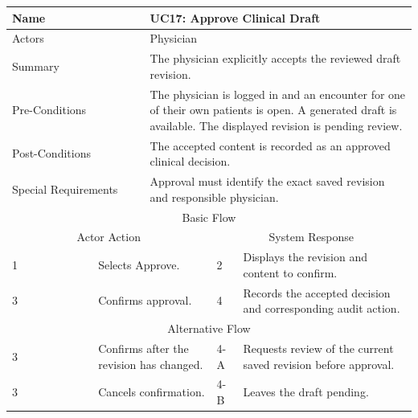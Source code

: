 \begin{reporttable}
\centering
\small
\caption{UC17: Approve Clinical Draft.}
\label{tab:kashaf:uc17}
\begin{tabular}{|p{}|p{}|p{}|p{}|p{}|}
\hline
\multicolumn{2}{|p{\dimexpr0.225\textwidth+2\tabcolsep+\arrayrulewidth\relax}|}{Name} & \multicolumn{3}{p{\dimexpr0.575\textwidth+4\tabcolsep+2\arrayrulewidth\relax}|}{UC17: Approve Clinical Draft} \\ \hline
\multicolumn{2}{|p{\dimexpr0.225\textwidth+2\tabcolsep+\arrayrulewidth\relax}|}{Actors} & \multicolumn{3}{p{\dimexpr0.575\textwidth+4\tabcolsep+2\arrayrulewidth\relax}|}{Physician} \\ \hline
\multicolumn{2}{|p{\dimexpr0.225\textwidth+2\tabcolsep+\arrayrulewidth\relax}|}{Summary} & \multicolumn{3}{p{\dimexpr0.575\textwidth+4\tabcolsep+2\arrayrulewidth\relax}|}{The physician explicitly accepts the reviewed draft revision.} \\ \hline
\multicolumn{2}{|p{\dimexpr0.225\textwidth+2\tabcolsep+\arrayrulewidth\relax}|}{Pre-Conditions} & \multicolumn{3}{p{\dimexpr0.575\textwidth+4\tabcolsep+2\arrayrulewidth\relax}|}{The physician is logged in and an encounter for one of their own patients is open. A generated draft is available. The displayed revision is pending review.} \\ \hline
\multicolumn{2}{|p{\dimexpr0.225\textwidth+2\tabcolsep+\arrayrulewidth\relax}|}{Post-Conditions} & \multicolumn{3}{p{\dimexpr0.575\textwidth+4\tabcolsep+2\arrayrulewidth\relax}|}{The accepted content is recorded as an approved clinical decision.} \\ \hline
\multicolumn{2}{|p{\dimexpr0.225\textwidth+2\tabcolsep+\arrayrulewidth\relax}|}{Special Requirements} & \multicolumn{3}{p{\dimexpr0.575\textwidth+4\tabcolsep+2\arrayrulewidth\relax}|}{Approval must identify the exact saved revision and responsible physician.} \\ \hline
\multicolumn{5}{|c|}{Basic Flow} \\ \hline
\multicolumn{3}{|c|}{Actor Action} & \multicolumn{2}{c|}{System Response} \\ \hline
1 & \multicolumn{2}{p{\dimexpr0.37\textwidth+2\tabcolsep+\arrayrulewidth\relax}|}{Selects Approve.} & 2 & Displays the revision and content to confirm. \\ \hline
3 & \multicolumn{2}{p{\dimexpr0.37\textwidth+2\tabcolsep+\arrayrulewidth\relax}|}{Confirms approval.} & 4 & Records the accepted decision and corresponding audit action. \\ \hline
\multicolumn{5}{|c|}{Alternative Flow} \\ \hline
3 & \multicolumn{2}{p{\dimexpr0.37\textwidth+2\tabcolsep+\arrayrulewidth\relax}|}{Confirms after the revision has changed.} & 4-A & Requests review of the current saved revision before approval. \\ \hline
3 & \multicolumn{2}{p{\dimexpr0.37\textwidth+2\tabcolsep+\arrayrulewidth\relax}|}{Cancels confirmation.} & 4-B & Leaves the draft pending. \\ \hline
\end{tabular}
\end{reporttable}

